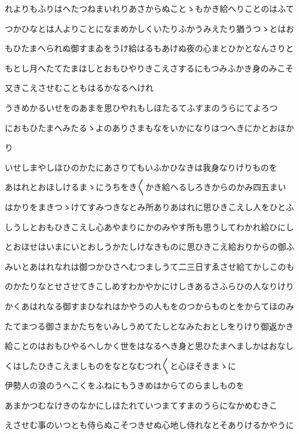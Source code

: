 \documentclass[a4paper,11pt,landscape]{ltjtarticle}
\begin{document}
\par\medskip
れよりもふりはへたつねまいれりあさからぬことゝもかき給へりことのはふて
\par\medskip
つかひなとは人よりことになまめかしくいたりふかうみえたり猶うつゝとはお
\par\medskip
もひたまへられぬ御すまゐをうけ給はるもあけぬ夜の心まとひかとなんさりと
\par\medskip
もとし月へたてたまはしとおもひやりきこえさするにもつみふかき身のみこそ
\par\medskip
又きこえさせむこともはるかなるへけれ
\par\medskip
うきめかるいせをのあまを思ひやれもしほたるてふすまのうらにてよろつ
\par\medskip
におもひたまへみたるゝよのありさまもなをいかになりはつへきにかとおほか
\par\medskip
り
\par\medskip
いせしまやしほひのかたにあさりてもいふかひなきは我身なりけりものを
\par\medskip
あはれとおほしけるまゝにうちをき〱かき給へるしろきからのかみ四五まい
\par\medskip
はかりをまきつゝけてすみつきなとみ所ありあはれに思ひきこえし人をひとふ
\par\medskip
しうしとおもひきこえし心あやまりにかのみやす所も思うしてわかれ給ひにし
\par\medskip
とおほせはいまにいとおしうかたしけなきものに思ひきこえ給おりからの御ふ
\par\medskip
みいとあはれなれは御つかひさへむつましうて二三日すゑさせ給てかしこのも
\par\medskip
のかたりなとせさせてきこしめすわかやかにけしきあるさふらひの人なりけり
\par\medskip
かくあはれなる御すまひなれはかやうの人もをのつからものとをからてほのみ
\par\medskip
たてまつる御さまかたちをいみしうめてたしとなみたおとしをりけり御返かき
\par\medskip
給ことのはおもひやるへしかく世をはなるへき身と思ひたまへましかはおなし
\par\medskip
くはしたひきこえましものをなとなむつれ〱と心ほそきまゝに
\par\medskip
伊勢人の浪のうへこくをふねにもうきめはからてのらましものを
\par\medskip
あまかつむなけきのなかにしほたれていつまてすまのうらになかめむきこ
\par\medskip
えさせむ事のいつとも侍らぬこそつきせぬ心地し侍れなとそありけるかやうに
\par\medskip
\end{document}
